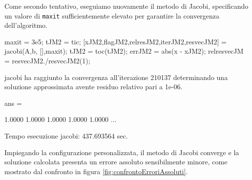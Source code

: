 Come secondo tentativo, eseguiamo nuovamente il metodo di Jacobi, specificando un valore di \lstinline{maxit} sufficientemente elevato per garantire la 
convergenza dell'algoritmo.
\begin{matlabcode}
    maxit = 3e5;
    tJM2 = tic;
    [xJM2,flagJM2,relresJM2,iterJM2,resvecJM2] = jacobi(A,b,
                                                 [],maxit);
    tJM2 = toc(tJM2);
    errJM2 = abs(x - xJM2);
    relresvecJM = resvecJM2./resvecJM2(1);
\end{matlabcode}
\begin{matlaboutput}
    jacobi ha raggiunto la convergenza all'iterazione 210137
    determinando una soluzione approssimata avente residuo
    relativo pari a 1e-06.

    ans =

    1.0000    1.0000    1.0000    1.0000    1.0000    ...
\end{matlaboutput}
\begin{matlaboutput}
    Tempo esecuzione jacobi: 437.693564 sec.
\end{matlaboutput}
Impiegando la configurazione personalizzata, il metodo di Jacobi converge e la soluzione calcolata presenta un errore assoluto sensibilmente minore, come 
mostrato dal confronto in figura \ref{fig:confrontoErroriAssoluti}.

